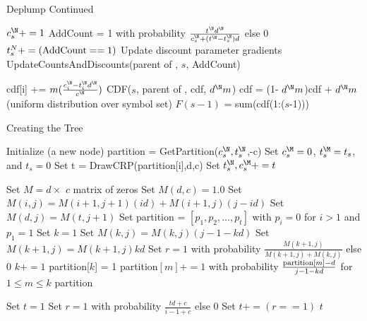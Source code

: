 \begin{algorithm}
    \caption{Deplump Continued}
    \begin{algorithmic}[1]
    
			\State $c^\N_s += 1$
			\State AddCount = 1 with probability $\frac{t^\N d^\N}{c^\N_s + (t^\N - t^\N_s)d}$ else 0 
			\State $t^N_s += ({\rm AddCount} == 1)$
		\EndIf
		\State Update discount parameter gradients
		\State UpdateCountsAndDiscounts(parent of \N, $s$, AddCount)
	\EndFunction	


			\State cdf[i] += $m(\frac{c^\N_i - t^\N_i d^\N}{c^\N})$
		\EndFor
			\State \Return CDF($s$, parent of \N, cdf, $d^\N m$)
		\Else
			\State cdf = (1- $d^\N m$)cdf + $d^\N m$(uniform distribution over symbol set) 
			\State $F(s-1)$ = sum(cdf(1:($s$-1)))
			\State \Return [$F(s-1), F(s) = F(s-1)$ + cdf($s$)]
		\EndIf 
	\EndFunction
	
	\EndFunction
    \end{algorithmic}
\end{algorithm}

\begin{algorithm}
	\begin{algorithmic}[1]
	\caption{Creating the Tree}
	
		\State Initialize \M (a new node)
			\State partition = GetPartition($c^\N_s, t^\N_s$,-c)
			\State Set $c^\M_s = 0$, $t^\M_s = t_s$, and $t_s = 0$
				\State Set t = DrawCRP(partition[i],d,c)
				\State Set $t^\N_s, c^\M_s += t$
			\EndFor
		\EndFor
	\EndFunction
	
		\State Set $M =  d \times$ $c$ matrix of zeros
		\State Set $M(d,c) = 1.0$
				\State Set $M(i,j) = M(i +1, j+1)(id)  + M(i+1,j)(j - id)$ 
			\EndFor
			\State Set $M(d,j) = M(t,j+1)$
		\EndFor
		\State Set partition = $[p_1, p_2, \ldots, p_t]$ with $p_i = 0$ for $i >1$ and $p_1 = 1$
		\State Set $k = 1$
			\State Set $M(k,j) = M(k,j)(j-1 -k d)$
			\State Set $M(k+1,j) = M(k+1,j)kd$
			\State Set $r = 1$ with probability $\frac{M(k+1,j)}{M(k+1,j) + M(k,j)}$ else 0
				\State $k += 1$
				\State partition[$k$] = 1
			\Else
				\State partition$[m] += 1$ with probability $\frac{{\rm partition}[m] - d}{j-1 -kd}$ for $1 \leq m \leq k$
			\EndIf
		\EndFor
		\State \Return partition
	\EndFunction
	
		\State Set $t = 1$
			\State Set $r = 1$ with probability $\frac{td + c}{i-1 + c}$ else 0
			\State Set $t += (r == 1)$
		\EndFor
		\State \Return $t$
	\EndFunction
	
	\end{algorithmic}	
\end{algorithm}